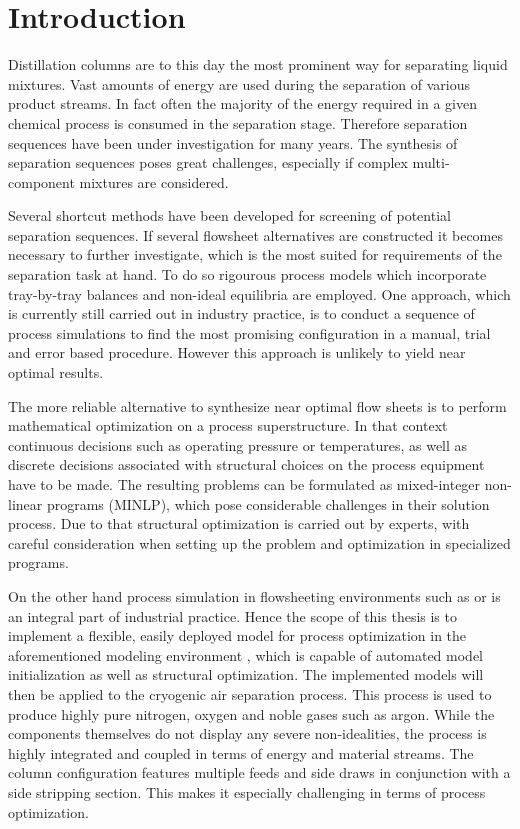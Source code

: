 \chapter{Introduction}
\label{chp:intro}
Distillation columns are to this day the most prominent way for separating liquid mixtures. Vast amounts of energy
are used during the separation of various product streams. In fact often the majority of the energy required in
a given chemical process is consumed in the separation stage. Therefore separation sequences have been under investigation
for many years. The synthesis of separation sequences poses great challenges, especially if complex
multi-component mixtures are considered.

Several shortcut methods have been developed for screening of potential separation sequences. If several
flowsheet alternatives are constructed it becomes necessary to further investigate, which is the most
suited for requirements of the separation task at hand. To do so rigourous process models which incorporate tray-by-tray balances and
non-ideal equilibria are employed. One approach, which is currently still carried out in industry practice,
is to conduct a sequence of process simulations to find the most promising configuration in a manual, trial
and error based procedure. However this approach is unlikely to yield near optimal results.

The more reliable alternative to synthesize near optimal flow sheets is to perform mathematical optimization
on a process superstructure. In that context continuous decisions such as operating pressure or temperatures,
as well as discrete decisions associated with structural choices on the process equipment have to be made. The
resulting problems can be formulated as mixed-integer non-linear programs (MINLP), which pose considerable challenges
in their solution process. Due to that structural optimization is carried out by experts, with careful consideration
when setting up the problem and optimization in specialized programs.

On the other hand process simulation in flowsheeting environments such as \aspen or \gproms is an integral
part of industrial practice. Hence the scope of this thesis is to implement a flexible, easily deployed
model for process optimization in the aforementioned modeling environment \gproms, which is capable of
automated model initialization as well as structural optimization.
The implemented models will then be applied to the cryogenic air separation process. This process is used to
produce highly pure nitrogen, oxygen and noble gases such as argon. While the components themselves
do not display any severe non-idealities, the process is highly integrated and coupled in terms of energy
and material streams. The column configuration features multiple feeds and side draws in conjunction with
a side stripping section. This makes it especially challenging in terms of process optimization.

